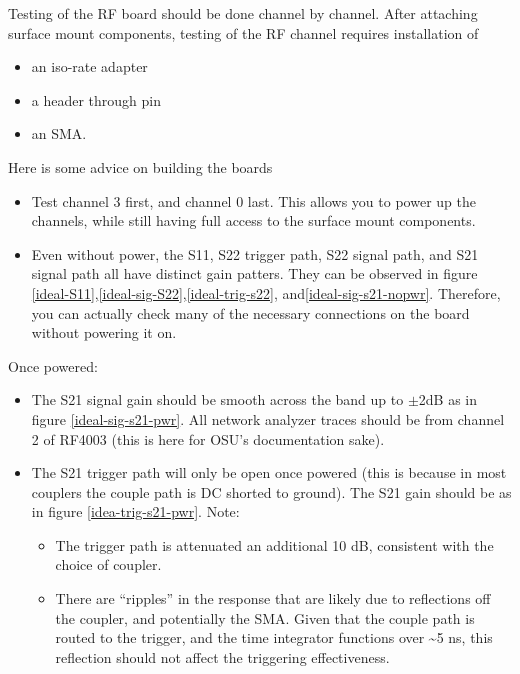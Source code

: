 \documentclass[letter,12pt]{article}
\begin{document}
Testing of the RF board should be done channel by channel. After attaching surface mount components, testing of the RF channel requires installation of 

\begin{itemize}
\item an iso-rate adapter
\item a header through pin
\item an SMA.
\end{itemize}
Here is some advice on building the boards
\begin{itemize}
\item Test channel 3 first, and channel 0 last. This allows you to power up the channels, while still having full access to the surface mount components. 
\item Even without power, the S11, S22 trigger path, S22 signal path, and S21 signal path all have distinct gain patters. They can be observed in figure \ref{ideal-S11},\ref{ideal-sig-S22},\ref{ideal-trig-s22}, and\ref{ideal-sig-s21-nopwr}. Therefore, you can actually check many of the necessary connections on the board without powering it on.
\end{itemize}
Once powered:
\begin{itemize}
\item The S21 signal gain should be smooth across the band up to $\pm$2dB as in figure \ref{ideal-sig-s21-pwr}. All network analyzer traces should be from channel 2 of RF4003 (this is here for OSU's documentation sake).
\item The S21 trigger path will only be open once powered (this is because in most couplers the couple path is DC shorted to ground). The S21 gain should be as in figure \ref{idea-trig-s21-pwr}. Note:
\begin{itemize}
\item The trigger path is attenuated an additional 10 dB, consistent with the choice of coupler.
\item There are ``ripples'' in the response that are likely due to reflections off the coupler, and potentially the SMA. Given that the couple path is routed to the trigger, and the time integrator functions over \textasciitilde{}5 ns, this reflection should not affect the triggering effectiveness.
\end{itemize}
\end{itemize}
\end{document}
